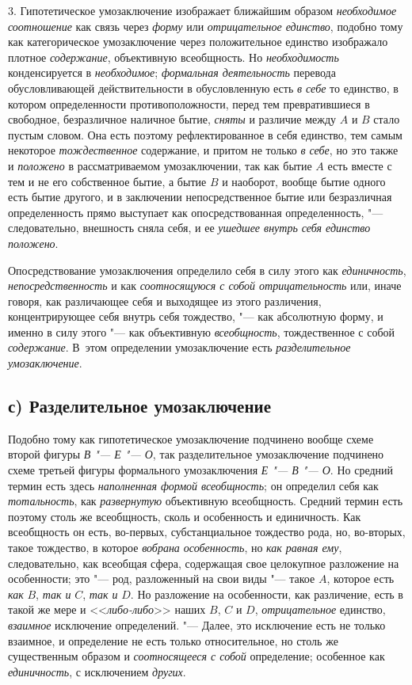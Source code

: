 3. Гипотетическое умозаключение изображает ближайшим образом
{\em необходимое соотношение}
как связь через {\em форму} или {\em отрицательное единство},
подобно тому как категорическое умозаключение через
положительное единство изображало плотное
{\em содержание}, объективную всеобщность. Но {\em необходимость}
конденсируется в {\em необходимое}; {\em формальная деятельность}
перевода обусловливающей действительности в обусловленную есть {\em в себе} то
единство, в котором определенности противоположности, перед тем
превратившиеся в свободное, безразличное наличное бытие,
{\em сняты} и различие между $A$ и $B$ стало пустым
словом. Она есть поэтому рефлектированное в себя единство,
тем самым некоторое {\em тождественное}
содержание, и притом не только {\em в себе}, но это также и {\em положено} в
рассматриваемом умозаключении, так как бытие $A$ есть вместе с тем
и не его собственное бытие, а бытие $B$ и наоборот,
вообще бытие одного есть бытие другого, и в заключении непосредственное
бытие или безразличная определенность прямо выступает как опосредствованная
определенность, "--- следовательно, внешность сняла себя, и ее
{\em ушедшее внутрь себя единство положено}.

Опосредствование умозаключения определило себя в силу этого
как {\em единичность}, {\em непосредственность} и
как {\em соотносящуюся с собой
отрицательность} или, иначе говоря, как различающее себя и
выходящее из этого различения, концентрирующее себя внутрь себя тождество,
"--- как абсолютную форму, и именно в силу этого "--- как объективную
{\em всеобщность}, тождественное с собой {\em содержание}. В~этом
определении умозаключение есть {\em разделительное умозаключение}.

\subsection[с) Разделительное умозаключение]{с) Разделительное умозаключение}
Подобно тому как гипотетическое умозаключение подчинено вообще
схеме второй фигуры {\em В "--- Е "--- О}, так разделительное
умозаключение подчинено схеме третьей фигуры формального умозаключения
{\em Е "--- В "--- О}. Но средний термин есть здесь
{\em наполненная формой всеобщность};
он определил себя как {\em тотальность}, как {\em развернутую}
объективную всеобщность. Средний термин есть поэтому столь же
всеобщность, сколь и особенность и единичность. Как всеобщность он есть,
во-первых, субстанциальное тождество рода, но, во-вторых, такое тождество,
в которое {\em вобрана особенность}, но {\em как равная ему},
следовательно, как всеобщая сфера, содержащая свое целокупное
разложение на особенности; это "--- род, разложенный на свои
виды "--- такое $A$,
которое есть {\em как} $B$, {\em так и} $C$, {\em так и} $D$. Но
разложение на особенности, как различение, есть в такой же мере и
<<{\em либо-либо}>> наших $B$, $C$ и $D$, {\em отрицательное}
единство, {\em взаимное} исключение определений. "--- Далее, это
исключение есть не только взаимное, и определение не есть только
относительное, но столь же существенным образом и {\em соотносящееся с собой}
определение; особенное как {\em единичность}, с исключением {\em других}.

